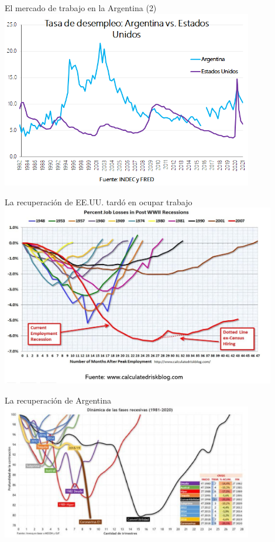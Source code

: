 \documentclass{beamer}
\begin{document}
\begin{frame}{El mercado de trabajo en la Argentina (2)}
\centering\includegraphics[width=11cm]{Slides Principios de Economia/Figures/C30.17b.png}
\end{frame}

\begin{frame}{La recuperación de EE.UU. tardó en ocupar trabajo}
\centering\includegraphics[width=12cm]{Slides Principios de Economia/Figures/P39.png}\
\end{frame}


\begin{frame}{La recuperación de Argentina}
\centering\includegraphics[width=11cm]{Slides Principios de Economia/Recesiones.jpg}\
\end{frame}
\end{document}
